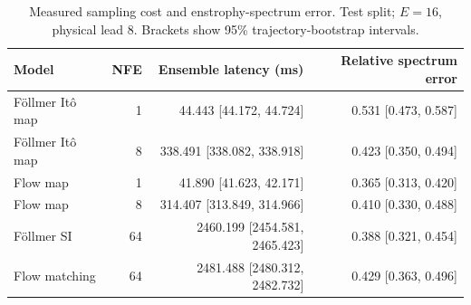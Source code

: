 \begin{table}[t]
\centering
\small
\setlength{\tabcolsep}{3pt}
\caption{Measured sampling cost and enstrophy-spectrum error. Test split; $E=16$, physical lead 8. Brackets show 95\% trajectory-bootstrap intervals.}
\label{tab:map-cost}
\begin{tabular}{lrrr}
\toprule
Model & NFE & Ensemble latency (ms) & Relative spectrum error \\
\midrule
Föllmer Itô map & 1 & 44.443 [44.172, 44.724] & 0.531 [0.473, 0.587] \\
Föllmer Itô map & 8 & 338.491 [338.082, 338.918] & 0.423 [0.350, 0.494] \\
\addlinespace
Flow map & 1 & 41.890 [41.623, 42.171] & 0.365 [0.313, 0.420] \\
Flow map & 8 & 314.407 [313.849, 314.966] & 0.410 [0.330, 0.488] \\
\addlinespace
Föllmer SI & 64 & 2460.199 [2454.581, 2465.423] & 0.388 [0.321, 0.454] \\
\addlinespace
Flow matching & 64 & 2481.488 [2480.312, 2482.732] & 0.429 [0.363, 0.496] \\
\bottomrule
\end{tabular}
\end{table}
